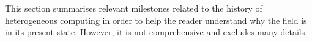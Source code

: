 \documentclass[a4paper,12pt,twoside,openright]{report}
\begin{document}
This section summarises relevant milestones related to the history of
heterogeneous computing in order to help the reader understand why the field is
in its present state. However, it is not comprehensive and excludes many
details.

\end{document}
